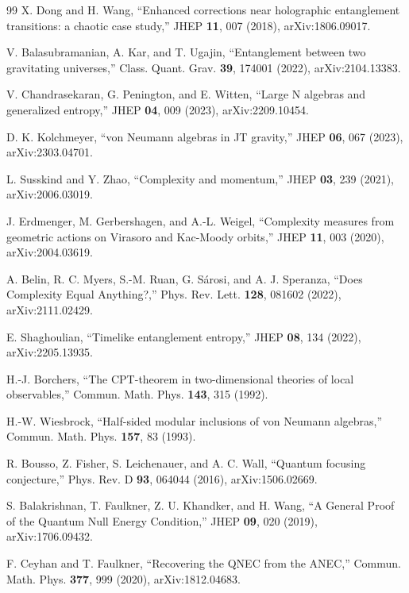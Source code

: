 \documentclass[12pt,a4paper]{article}
\begin{document}
\begin{thebibliography}{99}
X. Dong and H. Wang, ``Enhanced corrections near holographic entanglement transitions: a chaotic case study,'' JHEP \textbf{11}, 007 (2018), arXiv:1806.09017.

V. Balasubramanian, A. Kar, and T. Ugajin, ``Entanglement between two gravitating universes,'' Class. Quant. Grav. \textbf{39}, 174001 (2022), arXiv:2104.13383.

V. Chandrasekaran, G. Penington, and E. Witten, ``Large N algebras and generalized entropy,'' JHEP \textbf{04}, 009 (2023), arXiv:2209.10454.

D. K. Kolchmeyer, ``von Neumann algebras in JT gravity,'' JHEP \textbf{06}, 067 (2023), arXiv:2303.04701.

L. Susskind and Y. Zhao, ``Complexity and momentum,'' JHEP \textbf{03}, 239 (2021), arXiv:2006.03019.

J. Erdmenger, M. Gerbershagen, and A.-L. Weigel, ``Complexity measures from geometric actions on Virasoro and Kac-Moody orbits,'' JHEP \textbf{11}, 003 (2020), arXiv:2004.03619.

A. Belin, R. C. Myers, S.-M. Ruan, G. S\'arosi, and A. J. Speranza, ``Does Complexity Equal Anything?,'' Phys. Rev. Lett. \textbf{128}, 081602 (2022), arXiv:2111.02429.

E. Shaghoulian, ``Timelike entanglement entropy,'' JHEP \textbf{08}, 134 (2022), arXiv:2205.13935.

H.-J. Borchers, ``The CPT-theorem in two-dimensional theories of local observables,'' Commun. Math. Phys. \textbf{143}, 315 (1992).

H.-W. Wiesbrock, ``Half-sided modular inclusions of von Neumann algebras,'' Commun. Math. Phys. \textbf{157}, 83 (1993).

R. Bousso, Z. Fisher, S. Leichenauer, and A. C. Wall, ``Quantum focusing conjecture,'' Phys. Rev. D \textbf{93}, 064044 (2016), arXiv:1506.02669.

S. Balakrishnan, T. Faulkner, Z. U. Khandker, and H. Wang, ``A General Proof of the Quantum Null Energy Condition,'' JHEP \textbf{09}, 020 (2019), arXiv:1706.09432.

F. Ceyhan and T. Faulkner, ``Recovering the QNEC from the ANEC,'' Commun. Math. Phys. \textbf{377}, 999 (2020), arXiv:1812.04683.


\end{thebibliography}
\end{document}
